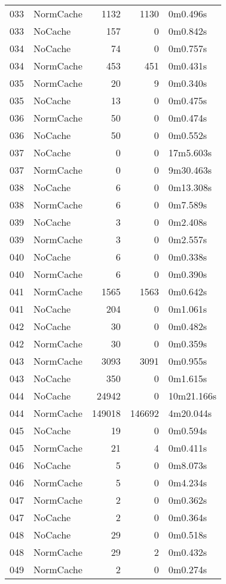 \begin{tabular}{llrrl}
033 & NormCache & 1132 & 1130 & 0m0.496s \\
033 & NoCache & 157 & 0 & 0m0.842s \\
034 & NoCache & 74 & 0 & 0m0.757s \\
034 & NormCache & 453 & 451 & 0m0.431s \\
035 & NormCache & 20 & 9 & 0m0.340s \\
035 & NoCache & 13 & 0 & 0m0.475s \\
036 & NormCache & 50 & 0 & 0m0.474s \\
036 & NoCache & 50 & 0 & 0m0.552s \\
037 & NoCache & 0 & 0 & 17m5.603s \\
037 & NormCache & 0 & 0 & 9m30.463s \\
038 & NoCache & 6 & 0 & 0m13.308s \\
038 & NormCache & 6 & 0 & 0m7.589s \\
039 & NoCache & 3 & 0 & 0m2.408s \\
039 & NormCache & 3 & 0 & 0m2.557s \\
040 & NoCache & 6 & 0 & 0m0.338s \\
040 & NormCache & 6 & 0 & 0m0.390s \\
041 & NormCache & 1565 & 1563 & 0m0.642s \\
041 & NoCache & 204 & 0 & 0m1.061s \\
042 & NoCache & 30 & 0 & 0m0.482s \\
042 & NormCache & 30 & 0 & 0m0.359s \\
043 & NormCache & 3093 & 3091 & 0m0.955s \\
043 & NoCache & 350 & 0 & 0m1.615s \\
044 & NoCache & 24942 & 0 & 10m21.166s \\
044 & NormCache & 149018 & 146692 & 4m20.044s \\
045 & NoCache & 19 & 0 & 0m0.594s \\
045 & NormCache & 21 & 4 & 0m0.411s \\
046 & NoCache & 5 & 0 & 0m8.073s \\
046 & NormCache & 5 & 0 & 0m4.234s \\
047 & NormCache & 2 & 0 & 0m0.362s \\
047 & NoCache & 2 & 0 & 0m0.364s \\
048 & NoCache & 29 & 0 & 0m0.518s \\
048 & NormCache & 29 & 2 & 0m0.432s \\
049 & NormCache & 2 & 0 & 0m0.274s \\

\end{tabular}
